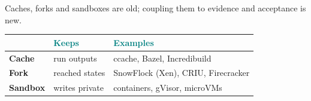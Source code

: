 \begin{frame}[t]{\ev{\tagO}Caches, forks and sandboxes are old; coupling them to evidence and acceptance is new.}
\vspace{.2cm}
{\fontsize{14}{17}\selectfont\renewcommand{\arraystretch}{1.35}
\begin{tabularx}{\linewidth}{@{}L{2.4cm}L{4.0cm}Y@{}}
\toprule
 & \textcolor{Teal}{\textbf{Keeps}} & \textcolor{Teal}{\textbf{Examples}}\\
\midrule
\textbf{Cache} & run outputs & \textcolor{Muted}{ccache, Bazel, Incredibuild}\\
\textbf{Fork} & reached states & \textcolor{Muted}{SnowFlock (Xen), CRIU, Firecracker}\\
\textbf{Sandbox} & writes private & \textcolor{Muted}{containers, gVisor, microVMs}\\
\bottomrule
\end{tabularx}\par}
\vspace{.15cm}

\end{frame}

